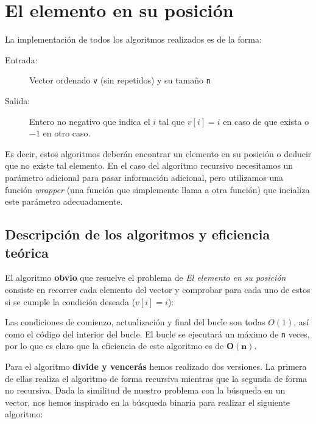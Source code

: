 \section{El elemento en su posición}

La implementación de todos los algoritmos realizados es de la forma:
\begin{description}
 \item[Entrada:] Vector ordenado \texttt{v} (sin repetidos) y su tamaño \texttt{n}
 \item[Salida:] Entero no negativo que indica el $i$ tal que $v[i]=i$ en caso de que exista o $-1$ en otro caso.
\end{description}

Es decir, estos algoritmos deberán encontrar un elemento en su posición o deducir que no existe tal elemento. En el caso del algoritmo recursivo necesitamos un parámetro adicional para pasar información adicional, pero utilizamos una función \textit{wrapper} (una función que simplemente llama a otra función) que incializa este parámetro adecuadamente.

\subsection{Descripción de los algoritmos y eficiencia teórica}

El algoritmo \textbf{obvio} que resuelve el problema de \textit{El elemento en su posición} consiste
en recorrer cada elemento del vector y comprobar para cada uno de estos si se cumple la
condición deseada ($v[i] = i$):



Las condiciones de comienzo, actualización y final del bucle son todas $O(1)$, así como el código del interior del bucle. El bucle se ejecutará un máximo de \texttt{n} veces, por lo que es claro que la eficiencia de este algoritmo es de $\mathbf{O(n)}$.

\vspace*{1cm}
\hrulefill
\vspace*{1cm}

Para el algoritmo \textbf{divide y vencerás} hemos realizado dos versiones. La primera de ellas realiza el algoritmo de forma recursiva mientras que la segunda de forma no recursiva. Dada la similitud de nuestro problema con la búsqueda en un vector, nos hemos inspirado en la búsqueda binaria para realizar el siguiente algoritmo:

